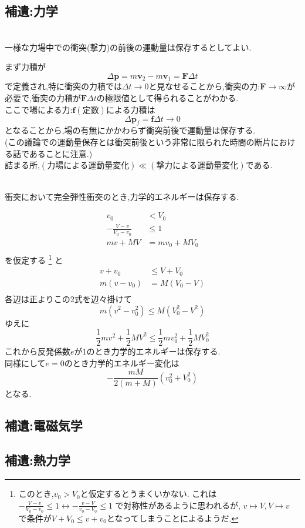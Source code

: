 \documentclass[dvipdfmx,uplatex]{jsarticle}
\begin{document}
\subsection{補遺:力学}
\begin{theo}[力場中の運動量保存]\mbox{} \\
一様な力場中での衝突(撃力)の前後の運動量は保存するとしてよい.
\end{theo}
まず力積が
\[
\Delta \bm{p} = m \bm{v}_2 - m \bm{v}_1 = \bm{F} \Delta t
\]
で定義され,特に衝突の力積では$\Delta t \rightarrow 0$と見なせることから,衝突の力:$\bm{F} \rightarrow \infty$が必要で,衝突の力積が$\bm{F} \Delta t$の極限値として得られることがわかる. \\
ここで場による力:$\bm{f}(定数)$による力積は
\[
\Delta \bm{p}_f = \bm{f} \Delta t \to 0
\]
となることから,場の有無にかかわらず衝突前後で運動量は保存する. \\
(この議論での運動量保存とは衝突前後という非常に限られた時間の断片における話であることに注意.) \\
詰まる所,$(力場による運動量変化) \ll (撃力による運動量変化)$である.

\begin{theo}[衝突と力学的エネルギー]\mbox{} \\
衝突において完全弾性衝突のとき,力学的エネルギーは保存する.
\end{theo}
\begin{align*}
	v_0 &< V_0 \\
	- \frac{V-v}{V_0 - v_0} &\leq 1 \\
	mv + MV &= mv_0 + MV_0 \\
\end{align*}
を仮定する
	\footnote{
		このとき,$v_0 > V_0$と仮定するとうまくいかない.
		これは
		$-\frac{V-v}{V_0-v_0}\leq 1 
		\leftrightarrow -\frac{v-V}{v_0-V_0}\leq 1$
		で対称性があるように思われるが,
		$v\mapsto V, V\mapsto v$
		で条件が$V+V_0\leq v+v_0$となってしまうことによるようだ.
	}
と
\begin{align*}
	v+v_0 &\leq V+V_0 \\
	m(v - v_0) &= M(V_0 -V)\\
\end{align*}
各辺は正よりこの2式を辺々掛けて
\[
	m(v^2 - v_0^2) \leq M(V_0^2 - V^2) 
\]
ゆえに 
\[
	\frac{1}{2}mv^2 + \frac{1}{2}MV^2 \leq \frac{1}{2}mv_0^2 + \frac{1}{2}MV_0^2
\]
これから反発係数$e$が1のとき力学的エネルギーは保存する. \\
同様にして$e=0$のとき力学的エネルギー変化は
\[
	- \frac{mM}{2(m+M)}(v_0^2 + V_0^2)
\]
となる.

\subsection{補遺:電磁気学}

\subsection{補遺:熱力学}
\end{document}
